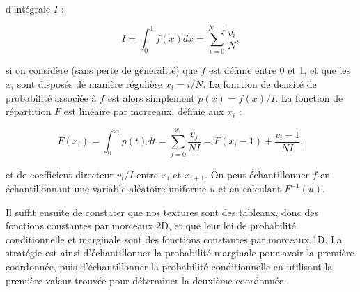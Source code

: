 d'intégrale $I$ :

\begin{equation}
    I = \int_{0}^{1} f(x) dx = \sum_{i=0}^{N-1} \frac{v_i}N,
\end{equation}

si on considère (sans perte de généralité) que $f$ est définie entre 0 et 1, et que les $x_i$ sont disposés de manière régulière $x_i = i / N$. La fonction de densité de probabilité associée à $f$ est alors simplement $p(x) = f(x) / I$. La fonction de répartition $F$ est linéaire par morceaux, définie aux $x_i$ :

\begin{equation}
    F(x_i) = \int_{0}^{x_i} p(t) dt = \sum_{j=0}^{x_i} \frac{v_j}{NI} = F(x_i-1) + \frac{v_i-1}{NI},
\end{equation}

et de coefficient directeur $v_i/I$ entre $x_i$ et $x_{i+1}$. On peut échantillonner $f$ en échantillonnant une variable aléatoire uniforme $u$ et en calculant $F^{-1}(u)$.

\bigskip

%
%
%


Il suffit ensuite de constater que nos textures sont des tableaux, donc des fonctions constantes par morceaux 2D, et que leur loi de probabilité conditionnelle et marginale sont des fonctions constantes par morceaux 1D. La stratégie est ainsi d'échantillonner la probabilité marginale pour avoir la première coordonnée, puis d'échantillonner la probabilité conditionnelle en utilisant la première valeur trouvée pour déterminer la deuxième coordonnée.

